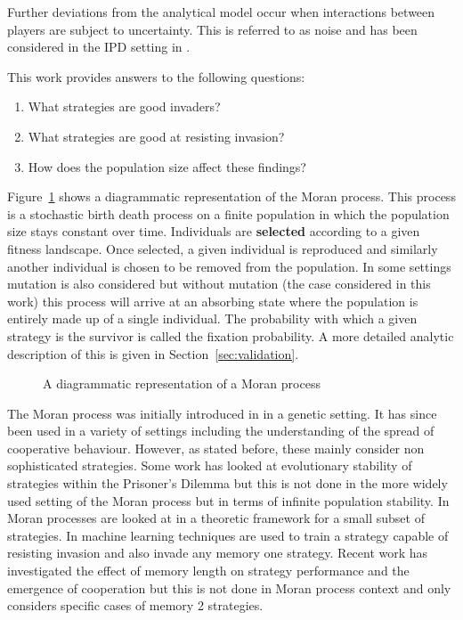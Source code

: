 \documentclass{article}
\begin{document}
Further deviations from the analytical model occur when interactions between
players are subject to uncertainty. This is referred to as noise and has been
considered in the IPD setting in \cite{Bendor1993, Nowak1993, Wu1995}.

This work provides answers to the following questions:

\begin{enumerate}
    \item What strategies are good invaders?
    \item What strategies are good at resisting invasion?
    \item How does the population size affect these findings?
\end{enumerate}

Figure~\ref{fig:moran_process} shows a diagrammatic representation of the Moran
process. This process is a stochastic birth death process on a finite population
in which the population size stays constant over time. Individuals are
\textbf{selected} according to a given fitness landscape. Once selected, a given
individual is reproduced and similarly another individual is chosen to be
removed from the population. In some settings mutation is also considered but
without mutation (the case considered in this work) this process will arrive at
an absorbing state where the population is entirely made up of a single
individual. The probability with which a given strategy is the survivor is
called the fixation probability. A more detailed analytic description of this
is given in Section~\ref{sec:validation}.

\begin{figure}[!hbtp]
    \centering
    
    \caption{A diagrammatic representation of a Moran process}
    \label{fig:moran_process}
\end{figure}

The Moran process was initially introduced in \cite{Moran1957} in a genetic
setting. It has since been used in a variety of settings including the
understanding of the spread of cooperative behaviour. However, as stated before,
these mainly consider non sophisticated strategies. Some work has looked at
evolutionary stability of strategies within the Prisoner's Dilemma \cite{Li2014}
but this is not done in the more widely used setting of the Moran process but in
terms of infinite population stability. In \cite{Baek2016} Moran processes are
looked at in a theoretic framework for a small subset of strategies. In
\cite{Lee2015} machine learning techniques are used to train a strategy capable
of resisting invasion and also invade any memory one strategy. Recent work
\cite{Hilbe2017} has investigated the effect of memory length on strategy
performance and the emergence of cooperation but this is not done in Moran
process context and only considers specific cases of memory 2 strategies.
\end{document}
